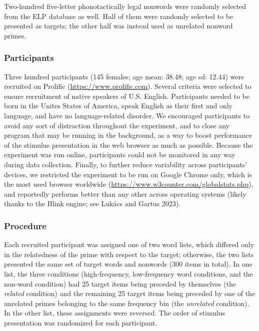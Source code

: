 \documentclass[
]{interact}
\begin{document}
Two-hundred five-letter phonotactically legal nonwords were randomly
selected from the ELP database as well. Half of them were randomly
selected to be presented as targets; the other half was instead used as
unrelated nonword primes.

\subsubsection{Participants}\label{sec-exp1-methods-participants}

Three hundred participants (145 females; age mean: 38.48; age sd: 12.44)
were recruited on Prolific (\url{https://www.prolific.com}). Several
criteria were selected to ensure recruitment of native speakers of U.S.
English. Participants needed to be born in the Unites States of America,
speak English as their first and only language, and have no
language-related disorder. We encouraged participants to avoid any sort
of distraction throughout the experiment, and to close any program that
may be running in the background, as a way to boost performance of the
stimulus presentation in the web browser as much as possible. Because
the experiment was run online, participants could not be monitored in
any way during data collection. Finally, to further reduce variability
across participants' devices, we restricted the experiment to be run on
Google Chrome only, which is the most used browser worldwide
(\url{https://www.w3counter.com/globalstats.php}), and reportedly
performs better than any other across operating systems (likely thanks
to the Blink engine; see Lukács and Gartus 2023).

\subsubsection{Procedure}\label{sec-exp1-methods-proc}

Each recruited participant was assigned one of two word lists, which
differed only in the relatedness of the prime with respect to the
target; otherwise, the two lists presented the same set of target words
and nonwords (300 items in total). In one list, the three conditions
(high-frequency, low-frequency word conditions, and the non-word
condition) had 25 target items being preceded by themselves (the
\emph{related} condition) and the remaining 25 target items being
preceded by one of the unrelated primes belonging to the same frequency
bin (the \emph{unrelated} condition). In the other list, these
assignments were reversed. The order of stimulus presentation was
randomized for each participant.
\end{document}
